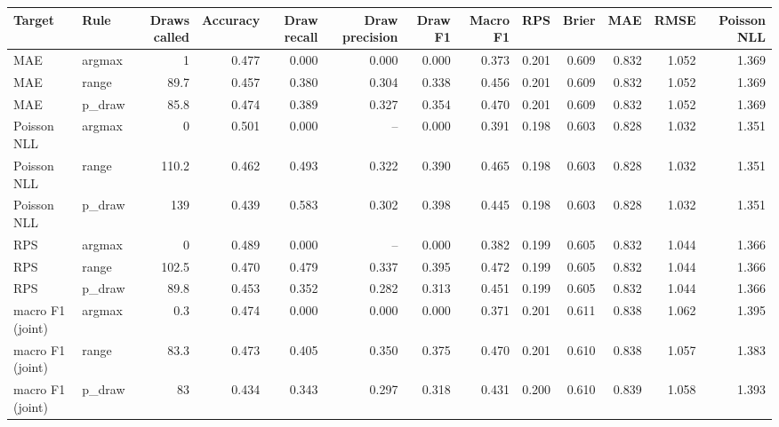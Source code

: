 
\begin{tabular}{llrrrrrrrrrrr}
\toprule
Target & Rule & Draws called & Accuracy & Draw recall & Draw precision & Draw F1 & Macro F1 & RPS & Brier & MAE & RMSE & Poisson NLL\\
\midrule
MAE & argmax & 1 & 0.477 & 0.000 & 0.000 & 0.000 & 0.373 & 0.201 & 0.609 & 0.832 & 1.052 & 1.369\\
MAE & range & 89.7 & 0.457 & 0.380 & 0.304 & 0.338 & 0.456 & 0.201 & 0.609 & 0.832 & 1.052 & 1.369\\
MAE & p\_draw & 85.8 & 0.474 & 0.389 & 0.327 & 0.354 & 0.470 & 0.201 & 0.609 & 0.832 & 1.052 & 1.369\\
Poisson NLL & argmax & 0 & 0.501 & 0.000 & -- & 0.000 & 0.391 & 0.198 & 0.603 & 0.828 & 1.032 & 1.351\\
Poisson NLL & range & 110.2 & 0.462 & 0.493 & 0.322 & 0.390 & 0.465 & 0.198 & 0.603 & 0.828 & 1.032 & 1.351\\
Poisson NLL & p\_draw & 139 & 0.439 & 0.583 & 0.302 & 0.398 & 0.445 & 0.198 & 0.603 & 0.828 & 1.032 & 1.351\\
RPS & argmax & 0 & 0.489 & 0.000 & -- & 0.000 & 0.382 & 0.199 & 0.605 & 0.832 & 1.044 & 1.366\\
RPS & range & 102.5 & 0.470 & 0.479 & 0.337 & 0.395 & 0.472 & 0.199 & 0.605 & 0.832 & 1.044 & 1.366\\
RPS & p\_draw & 89.8 & 0.453 & 0.352 & 0.282 & 0.313 & 0.451 & 0.199 & 0.605 & 0.832 & 1.044 & 1.366\\
macro F1 (joint) & argmax & 0.3 & 0.474 & 0.000 & 0.000 & 0.000 & 0.371 & 0.201 & 0.611 & 0.838 & 1.062 & 1.395\\
macro F1 (joint) & range & 83.3 & 0.473 & 0.405 & 0.350 & 0.375 & 0.470 & 0.201 & 0.610 & 0.838 & 1.057 & 1.383\\
macro F1 (joint) & p\_draw & 83 & 0.434 & 0.343 & 0.297 & 0.318 & 0.431 & 0.200 & 0.610 & 0.839 & 1.058 & 1.393\\
\bottomrule
\end{tabular}
